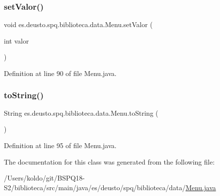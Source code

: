 \subsubsection{\texorpdfstring{set\+Valor()}{setValor()}}
{\footnotesize\ttfamily void es.\+deusto.\+spq.\+biblioteca.\+data.\+Menu.\+set\+Valor (\begin{DoxyParamCaption}\item[{int}]{valor }\end{DoxyParamCaption})}



Definition at line 90 of file Menu.\+java.

\mbox{\label{classes_1_1deusto_1_1spq_1_1biblioteca_1_1data_1_1_menu_a3385f0a3f0088252e92ba4ec820b7649}} 
\subsubsection{\texorpdfstring{to\+String()}{toString()}}
{\footnotesize\ttfamily String es.\+deusto.\+spq.\+biblioteca.\+data.\+Menu.\+to\+String (\begin{DoxyParamCaption}{ }\end{DoxyParamCaption})}



Definition at line 95 of file Menu.\+java.



The documentation for this class was generated from the following file\+:\begin{DoxyCompactItemize}
\item 
/\+Users/koldo/git/\+B\+S\+P\+Q18-\/\+S2/biblioteca/src/main/java/es/deusto/spq/biblioteca/data/\mbox{\hyperlink{_menu_8java}{Menu.\+java}}\end{DoxyCompactItemize}
